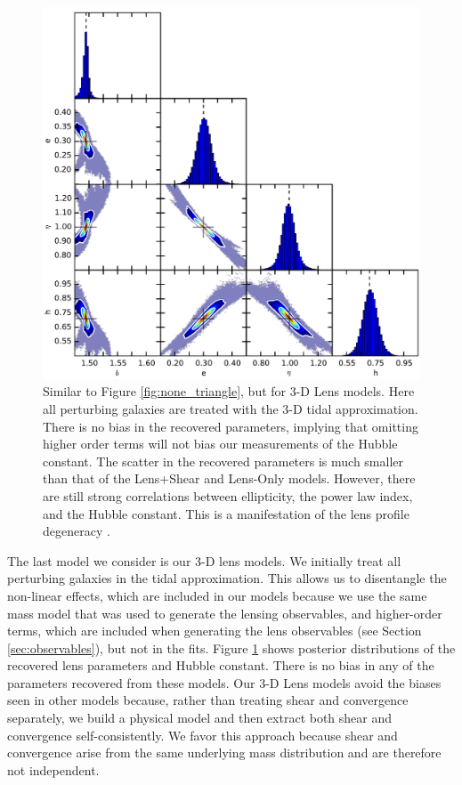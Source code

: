 \documentclass{emulateapj}
\begin{document}
\begin{figure}[ht]
\begin{center}
\includegraphics[width=1\textwidth]{all_los_1e-2.pdf}
\caption{\label{fig:los_triangle} Similar to Figure \ref{fig:none_triangle}, but for 3-D Lens models. Here all perturbing galaxies are treated with the 3-D tidal approximation.  There is no bias in the recovered parameters, implying that omitting higher order terms will not bias our measurements of the Hubble constant. The scatter in the recovered parameters is much smaller than that of the Lens+Shear and Lens-Only models. However, there are still strong correlations between ellipticity, the power law index, and the Hubble constant. This is a manifestation of the lens profile degeneracy \citep{Kochanek02}. %
}
\end{center}
\end{figure}

The last model we consider is our 3-D lens models. We initially treat all perturbing galaxies in the tidal approximation. This allows us to disentangle the non-linear effects, which are included in our models because we use the same mass model that was used to generate the lensing observables, and higher-order terms, which are included when generating the lens observables (see Section \ref{sec:observables}), but not in the fits. 
Figure \ref{fig:los_triangle} shows posterior distributions of the recovered lens parameters and Hubble constant. There is no bias in any of the parameters recovered from these models. Our 3-D Lens models avoid the biases seen in other models because, rather than treating shear and convergence separately, we build a physical model and then extract both shear and convergence self-consistently. We favor this approach because shear and convergence arise from the same underlying mass distribution and are therefore not independent.
\end{document}
